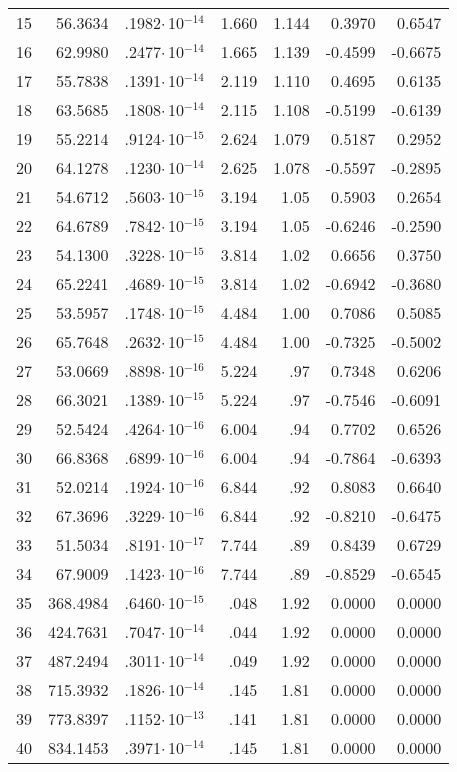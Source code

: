 {\begin{longtable}{|l||r|r|r|r|r|r|}
15 & 56.3634 & .1982$\cdot$\,10$^{-14}$ & 1.660 & 1.144 & 0.3970 &  0.6547 \\
16 & 62.9980 & .2477$\cdot$\,10$^{-14}$ & 1.665 & 1.139 & -0.4599 & -0.6675 \\
17 & 55.7838 & .1391$\cdot$\,10$^{-14}$ & 2.119 & 1.110 & 0.4695 & 0.6135 \\
18 & 63.5685 & .1808$\cdot$\,10$^{-14}$ & 2.115 & 1.108 & -0.5199 & -0.6139 \\
19 & 55.2214 & .9124$\cdot$\,10$^{-15}$ & 2.624 & 1.079 & 0.5187 & 0.2952 \\
20 & 64.1278 & .1230$\cdot$\,10$^{-14}$ & 2.625 & 1.078 & -0.5597 & -0.2895 \\
21 & 54.6712 & .5603$\cdot$\,10$^{-15}$ & 3.194 & 1.05 & 0.5903 & 0.2654 \\
22 & 64.6789 & .7842$\cdot$\,10$^{-15}$ & 3.194 & 1.05 & -0.6246 & -0.2590 \\
23 & 54.1300 & .3228$\cdot$\,10$^{-15}$ & 3.814 & 1.02 & 0.6656 & 0.3750 \\
24 & 65.2241 & .4689$\cdot$\,10$^{-15}$ & 3.814 & 1.02 & -0.6942 & -0.3680 \\
25 & 53.5957 & .1748$\cdot$\,10$^{-15}$ & 4.484 & 1.00 & 0.7086 & 0.5085 \\
26 & 65.7648 & .2632$\cdot$\,10$^{-15}$ & 4.484 & 1.00 & -0.7325 & -0.5002 \\
27 & 53.0669 & .8898$\cdot$\,10$^{-16}$ & 5.224 & .97 & 0.7348 & 0.6206 \\
28 & 66.3021 & .1389$\cdot$\,10$^{-15}$ & 5.224 & .97 & -0.7546 & -0.6091 \\
29 & 52.5424 & .4264$\cdot$\,10$^{-16}$ & 6.004 & .94 & 0.7702 & 0.6526 \\
30 & 66.8368 & .6899$\cdot$\,10$^{-16}$ & 6.004 & .94 & -0.7864 & -0.6393 \\
31 & 52.0214 & .1924$\cdot$\,10$^{-16}$ & 6.844 & .92 & 0.8083 & 0.6640 \\
32 & 67.3696 & .3229$\cdot$\,10$^{-16}$ & 6.844 & .92 & -0.8210 & -0.6475 \\
33 & 51.5034 & .8191$\cdot$\,10$^{-17}$ & 7.744 & .89 & 0.8439 & 0.6729 \\
34 & 67.9009 & .1423$\cdot$\,10$^{-16}$ & 7.744 & .89 & -0.8529 & -0.6545 \\
35 & 368.4984 & .6460$\cdot$\,10$^{-15}$ & .048 & 1.92 & 0.0000 & 0.0000 \\
36 & 424.7631 & .7047$\cdot$\,10$^{-14}$ & .044 & 1.92 & 0.0000 & 0.0000 \\
37 & 487.2494 & .3011$\cdot$\,10$^{-14}$ & .049 & 1.92 & 0.0000 & 0.0000 \\
38 & 715.3932 & .1826$\cdot$\,10$^{-14}$ & .145 & 1.81 & 0.0000 & 0.0000 \\
39 & 773.8397 & .1152$\cdot$\,10$^{-13}$ & .141 & 1.81 & 0.0000 & 0.0000 \\
40 & 834.1453 &  .3971$\cdot$\,10$^{-14}$ & .145 & 1.81 & 0.0000 & 0.0000 \\
\hline
\end{longtable}


}
